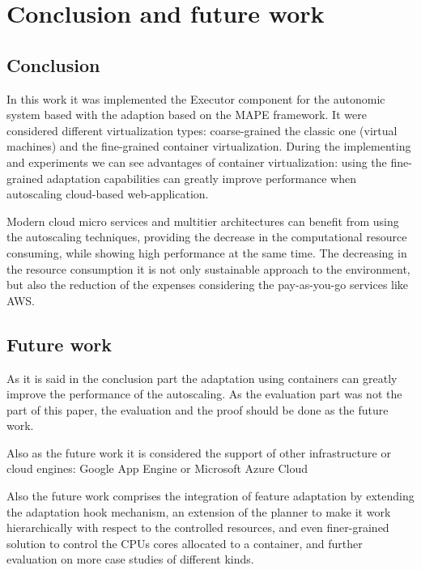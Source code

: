 \chapter{Conclusion and future work}
\label{conclusion}

\section{Conclusion}
In this work it was implemented the Executor component for the autonomic system based with the adaption based on the MAPE framework. It were considered different virtualization types: coarse-grained the classic one (virtual machines) and the fine-grained container virtualization. During the implementing and experiments we can see advantages of container virtualization: using the fine-grained adaptation capabilities can greatly improve performance when autoscaling cloud-based web-application.

Modern cloud micro services and multitier architectures can benefit from using the autoscaling techniques, providing the decrease in the computational resource consuming, while showing high performance at the same time. The decreasing in the resource consumption it is not only sustainable approach to the environment, but also the reduction of the expenses considering the pay-as-you-go services like AWS.


\section{Future work}
As it is said in the conclusion part the adaptation using containers can greatly improve the performance of the autoscaling. As the evaluation part was not the part of this paper, the evaluation and the proof should be done as the future work.

Also as the future work it is considered the support of other infrastructure or cloud engines: Google App Engine or Microsoft Azure Cloud

Also the future work comprises the integration of feature adaptation by extending the adaptation hook mechanism, an extension of the planner to make it work hierarchically with respect to the controlled resources, and even finer-grained solution to control the CPUs cores allocated to a container, and further evaluation on more case studies of different kinds.